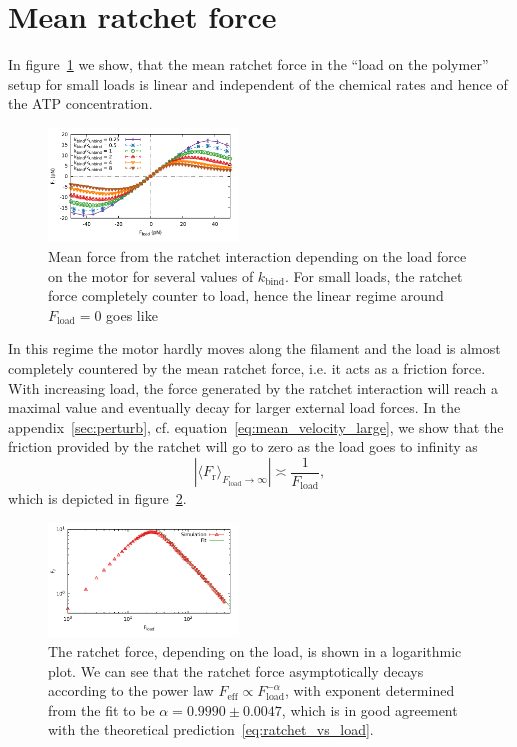 \documentclass[aps,pre,twocolumn,showpacs,showkeys,superscriptaddress,floatfix]{revtex4-1}
\begin{document}
\section{Mean ratchet force}
\label{sec:mean_ratchet_force}
In figure~\ref{fig:ratchet_force} we show, 
that the mean ratchet force in the ``load on the polymer'' setup for small loads is linear and independent of the chemical rates and hence of the ATP concentration. 
\begin{figure}[t]
\centering
\includegraphics[width=0.45\textwidth,height=!]{ratchet_force}
\caption{
\label{fig:ratchet_force}
Mean force from the ratchet interaction depending on the load force on the motor for several values of $k_\text{bind}$. 
For small loads, the ratchet force completely counter to load, hence the linear regime around $F_\text{load}=0$ goes like
}
\end{figure}
In this regime the motor hardly moves along the filament and the load is almost completely countered by the mean ratchet force, i.e. it acts as a friction force.
With increasing load, the force generated by the ratchet interaction will reach a maximal value and eventually decay for larger external load forces. 
In the appendix~\ref{sec:perturb}, cf. equation~\eqref{eq:mean_velocity_large}, we show that the friction provided by the ratchet will go to zero as the load goes to infinity as 
\begin{equation}
\left| \langle F_\text{r} \rangle_{F_\text{load}\rightarrow\infty} \right| \asymp \frac{1}{F_\text{load}} , 
\label{eq:ratchet_vs_load}
\end{equation}
which is depicted in figure~\ref{fig:ratchet_force_decay}. 
\begin{figure}[t]
\centering
\includegraphics[width=0.45\textwidth,height=!]{ratchet_force_decay}
\caption{
\label{fig:ratchet_force_decay}
The ratchet force, depending on the load, is shown in a logarithmic plot. 
We can see that the ratchet force asymptotically decays according to the power law $F_\text{eff} \propto F_\text{load}^{-\alpha}$, 
with exponent determined from the fit to be $\alpha = 0.9990 \pm 0.0047$, 
which is in good agreement with the theoretical prediction~\eqref{eq:ratchet_vs_load}.
}
\end{figure}
\end{document}
